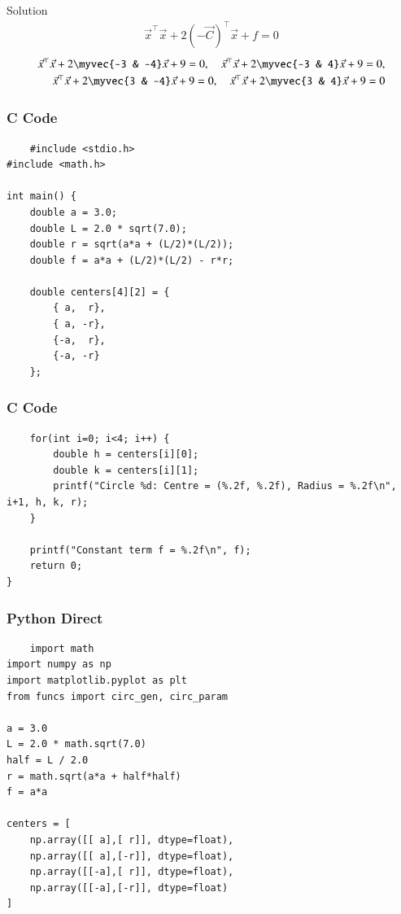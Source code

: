 \documentclass{beamer}
\begin{document}
\begin{frame}{Solution}
\begin{align}
\vec{x}^\top \vec{x} + 2(-\vec{C})^\top \vec{x} + f = 0 
\end{align}
\begin{align}
\vec{x}^\top \vec{x} + 2 \myvec{-3 & -4} \vec{x} + 9 = 0, \quad
\vec{x}^\top \vec{x} + 2 \myvec{-3 & 4} \vec{x} + 9 = 0, \\
\vec{x}^\top \vec{x} + 2 \myvec{3 & -4} \vec{x} + 9 = 0, \quad
\vec{x}^\top \vec{x} + 2 \myvec{3 & 4} \vec{x} + 9 = 0 
\end{align}
\end{frame}
\begin{frame}[fragile]
\frametitle{C Code}
\begin{lstlisting}
    #include <stdio.h>
#include <math.h>

int main() {
    double a = 3.0;
    double L = 2.0 * sqrt(7.0);
    double r = sqrt(a*a + (L/2)*(L/2));
    double f = a*a + (L/2)*(L/2) - r*r;

    double centers[4][2] = {
        { a,  r},
        { a, -r},
        {-a,  r},
        {-a, -r}
    };
    \end{lstlisting}  
\end{frame}
\begin{frame}[fragile]
\frametitle{C Code}
\begin{lstlisting}
    for(int i=0; i<4; i++) {
        double h = centers[i][0];
        double k = centers[i][1];
        printf("Circle %d: Centre = (%.2f, %.2f), Radius = %.2f\n", i+1, h, k, r);
    }

    printf("Constant term f = %.2f\n", f);
    return 0;
}

\end{lstlisting}
\end{frame}
\begin{frame}[fragile]
\frametitle{Python Direct}
\begin{lstlisting}
    import math
import numpy as np
import matplotlib.pyplot as plt
from funcs import circ_gen, circ_param

a = 3.0
L = 2.0 * math.sqrt(7.0)
half = L / 2.0
r = math.sqrt(a*a + half*half)
f = a*a

centers = [
    np.array([[ a],[ r]], dtype=float),
    np.array([[ a],[-r]], dtype=float),
    np.array([[-a],[ r]], dtype=float),
    np.array([[-a],[-r]], dtype=float)
]
\end{lstlisting}
\end{frame}
\end{document}
